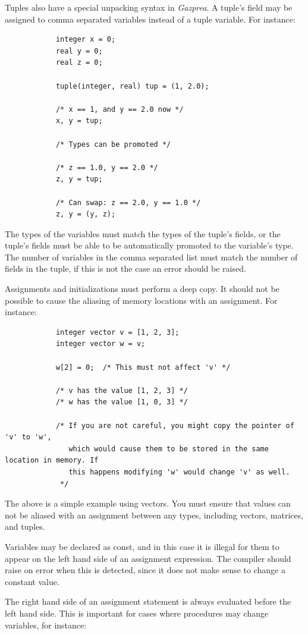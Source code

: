 \documentclass{article}
\begin{document}
		Tuples also have a special unpacking syntax in \textit{Gazprea}. A tuple's field may be assigned to comma
		separated variables instead of a tuple variable. For instance:

		\begin{lstlisting}
			integer x = 0;
			real y = 0;
			real z = 0;

			tuple(integer, real) tup = (1, 2.0);

			/* x == 1, and y == 2.0 now */
			x, y = tup;

			/* Types can be promoted */

			/* z == 1.0, y == 2.0 */
			z, y = tup;

			/* Can swap: z == 2.0, y == 1.0 */
			z, y = (y, z);
		\end{lstlisting}

		The types of the variables must match the types of the tuple's fields, or the tuple's fields must be able to be
		automatically promoted to the variable's type. The number of variables in the comma separated list must match
		the number of fields in the tuple, if this is not the case an error should be raised.

		Assignments and initializations must perform a deep copy. It should not be possible to cause the aliasing of
		memory locations with an assignment. For instance:

		\begin{lstlisting}
			integer vector v = [1, 2, 3];
			integer vector w = v;

			w[2] = 0;  /* This must not affect 'v' */

			/* v has the value [1, 2, 3] */
			/* w has the value [1, 0, 3] */

			/* If you are not careful, you might copy the pointer of 'v' to 'w',
			   which would cause them to be stored in the same location in memory. If
			   this happens modifying 'w' would change 'v' as well.
			 */
		\end{lstlisting}

		The above is a simple example using vectors. You must ensure that values can not be aliased with an assignment
		between any types, including vectors, matrices, and tuples.

		Variables may be declared as const, and in this case it is illegal for them to appear on the left hand side of
		an assignment expression. The compiler should raise on error when this is detected, since it does not make sense
		to change a constant value.

		The right hand side of an assignment statement is always evaluated before the left hand side. This is important
		for cases where procedures may change variables, for instance:
\end{document}
